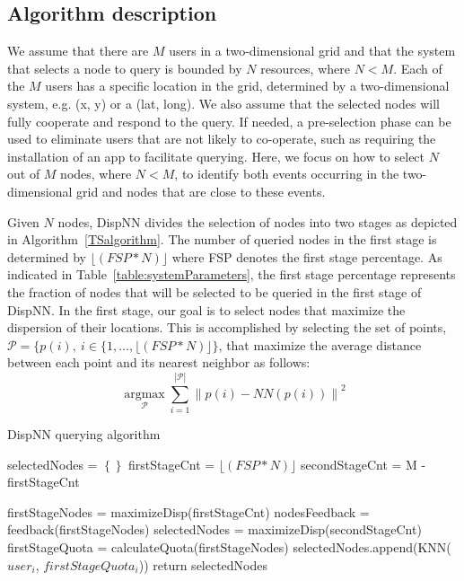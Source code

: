 \documentclass{acm_proc_article-sp}
\newcommand\floor[1]{\lfloor#1\rfloor}
\DeclareMathOperator*{\argmax}{argmax}
\newcommand{\norm}[1]{\left\lVert #1 \right\rVert}
\begin{document}
\subsection{Algorithm description}
We assume that there are $M$ users in a two-dimensional grid and that the system that selects a node to query is bounded by $N$ resources, where $N < M$.  Each of the $M$ users has a specific location in the grid, determined by a two-dimensional system, e.g. (x, y) or a (lat, long). We also assume that the selected nodes will fully cooperate and respond to the query. If needed, a pre-selection phase can be used to eliminate users that are not likely to co-operate, such as requiring the installation of an app to facilitate querying. Here, we focus on how to select $N$ out of $M$ nodes, where $N < M$, to identify both events occurring in the two-dimensional grid and nodes that are close to these events.\par

Given $N$ nodes, DispNN divides the selection of nodes into two stages as depicted in Algorithm~\ref{TSalgorithm}. The number of queried nodes in the first stage is determined by $\floor{(FSP*N)}$ where FSP denotes the first stage percentage. As indicated in Table~\ref{table:systemParameters}, the first stage percentage represents the fraction of nodes that will be selected to be queried in the first stage of DispNN. In the first stage, our goal is to select nodes that maximize the dispersion of their locations. This is accomplished by selecting the set of points, $\mathcal{P} = \{ p(i), \ i \in \{ 1,..., \floor{(FSP*N)} \}$, that maximize the average distance between each point and its nearest neighbor as follows:
\begin{equation} \label{eq:maxDisp}
\argmax\limits_{\mathcal{P}} \sum_{i=1}^{|\mathcal{P} |} \norm{p(i) - NN(p(i))}^2
\end{equation}


\begin{algorithm}[!htb]
\caption{DispNN querying algorithm}
\label{TSalgorithm}
\begin{algorithmic}[1]
      \State selectedNodes = $\left\{\right\}$
      \State firstStageCnt = $\floor{(FSP*N)}$
      \State secondStageCnt = M - firstStageCnt
      
      \State firstStageNodes = maximizeDisp(firstStageCnt) 
      \State nodesFeedback = feedback(firstStageNodes)  
           
             \State selectedNodes = maximizeDisp(secondStageCnt){}
      \Else
        	\State firstStageQuota = calculateQuota(firstStageNodes) 
	   \State selectedNodes.append(KNN($user_i$, $firstStageQuota_i$))  
		\EndFor
 		\EndIf 
\State return {selectedNodes}
\EndFunction
\end{algorithmic}
\end{algorithm}
\end{document}
